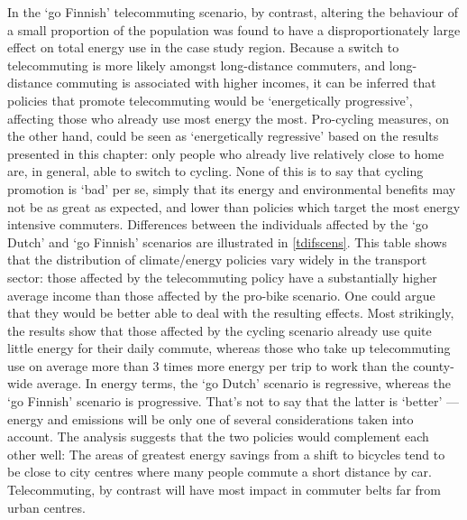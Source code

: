 In the `go Finnish' telecommuting scenario, by contrast, altering the
behaviour of a small proportion of the population was found to have a
disproportionately large effect on total energy use in the case study region.
Because a switch to telecommuting is more likely amongst long-distance commuters,
and long-distance commuting is associated with higher incomes, it
can be inferred that policies that promote telecommuting would be
`energetically progressive', affecting those who already use most energy the most.
Pro-cycling measures, on the other hand, could be seen as `energetically
regressive' based on the results presented in this chapter: only people
who already live relatively close to home are, in general, able to switch to
cycling. None of this is to say that cycling promotion is `bad' per se,
simply that its energy and environmental benefits may not be as great as
expected, and lower than policies which target the most energy intensive
commuters. Differences between the individuals affected by the `go Dutch'
and `go Finnish' scenarios are illustrated in \cref{tdifscens}. This table
shows that the distribution of climate/energy policies vary widely in
the transport sector: those affected by the telecommuting policy have
a substantially higher average income than those affected by the pro-bike
scenario. One could argue that they would be better able to deal with the
resulting effects. Most strikingly, the results show that those affected
by the cycling scenario already use quite little energy for their daily commute,
whereas those who take up telecommuting use on average more than 3 times more
energy per trip to work than the county-wide average. In energy terms,
the `go Dutch' scenario is regressive, whereas the `go Finnish' scenario is
progressive. That's not to say that the latter is `better' --- energy and
emissions will be only one of several considerations taken into account.
The analysis suggests that the two policies would complement each other well:
The areas of greatest energy savings from a shift to bicycles tend to be close
to city centres where many people commute a short distance by car.
Telecommuting, by contrast will have most impact in commuter belts far from
urban centres.

